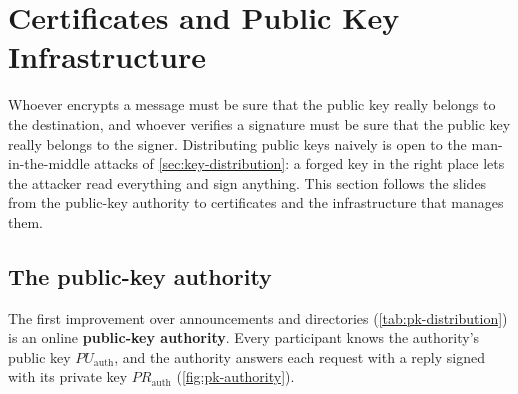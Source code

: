\section{Certificates and Public Key Infrastructure}
\label{sec:pki}

Whoever encrypts a message must be sure that the public key really belongs to the destination, and whoever verifies a signature must be sure that the public key really belongs to the signer. Distributing public keys naively is open to the man-in-the-middle attacks of \cref{sec:key-distribution}: a forged key in the right place lets the attacker read everything and sign anything. This section follows the slides from the public-key authority to certificates and the infrastructure that manages them.


\subsection{The public-key authority}

The first improvement over announcements and directories (\cref{tab:pk-distribution}) is an online \textbf{public-key authority}. Every participant knows the authority's public key $PU_{\mathrm{auth}}$, and the authority answers each request with a reply signed with its private key $PR_{\mathrm{auth}}$ (\cref{fig:pk-authority}).


